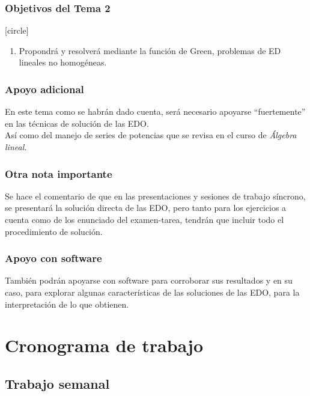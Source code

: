 \documentclass[12pt]{beamer}
\begin{document}
\begin{frame}
\frametitle{Objetivos del Tema 2}
[circle]
\begin{enumerate}
\conti
\item Propondrá y resolverá mediante la función de Green, problemas de ED lineales no homogéneas.
\end{enumerate}
\end{frame}
\begin{frame}
\frametitle{Apoyo adicional}
En este tema como se habrán dado cuenta, será necesario apoyarse \enquote{fuertemente} en las técnicas de solución de las EDO.
\\
\bigskip
\pause
Así como del manejo de series de potencias que se revisa en el curso de \emph{Álgebra lineal.}
\end{frame}
\begin{frame}
\frametitle{Otra nota importante}
Se hace el comentario de que en las presentaciones y sesiones de trabajo síncrono, se presentará la solución directa de las EDO, pero tanto para los ejercicios a cuenta como de los enunciado del examen-tarea, tendrán que incluir todo el procedimiento de solución.
\end{frame}
\begin{frame}
\frametitle{Apoyo con software}
También podrán apoyarse con software para corroborar sus resultados y en su caso, para explorar algunas características de las soluciones de las EDO, para la interpretación de lo que obtienen.
\end{frame}

\section{Cronograma de trabajo}
\subsection{Trabajo semanal}
\end{document}
